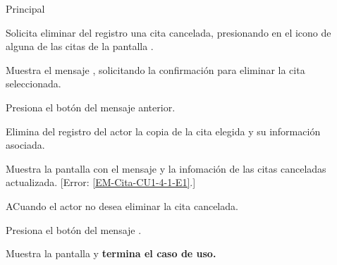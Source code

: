 \begin{UCtrayectoria}{Principal}

	\UCpaso [\UCactor] Solicita eliminar del registro una cita cancelada, presionando en el icono  de alguna de las citas de la pantalla .

	\UCpaso Muestra el mensaje , solicitando la confirmación para eliminar la cita seleccionada. 

	\UCpaso Presiona el botón  del mensaje anterior.  
 
	\UCpaso Elimina del registro del actor la copia de la cita elegida y su información asociada. 

	\UCpaso Muestra la pantalla  con el mensaje  y la infomación de las citas canceladas actualizada. [Error: \ref{EM-Cita-CU1-4-1-E1}.]
	

\end{UCtrayectoria}

\begin{UCtrayectoriaA}{A}{Cuando el actor no desea eliminar la cita cancelada.}

	\UCpaso Presiona el botón  del mensaje .

	\UCpaso Muestra la pantalla  y \textbf{termina el caso de uso.}

\end{UCtrayectoriaA}